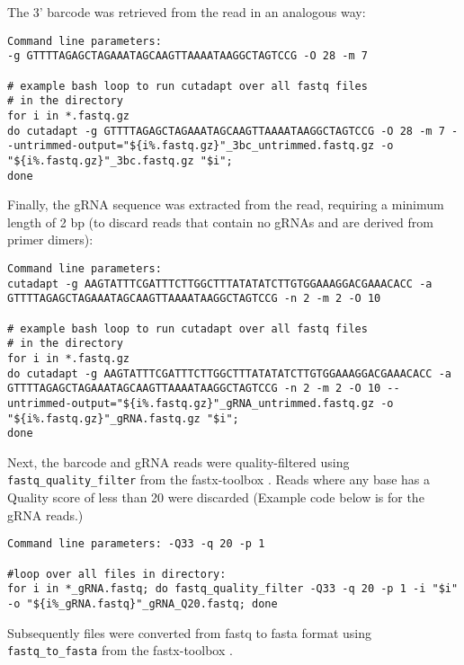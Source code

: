 The 3' barcode was retrieved from the read in an analogous way:

\begin{small}\begin{lstlisting}
Command line parameters:
-g GTTTTAGAGCTAGAAATAGCAAGTTAAAATAAGGCTAGTCCG -O 28 -m 7

# example bash loop to run cutadapt over all fastq files
# in the directory
for i in *.fastq.gz
do cutadapt -g GTTTTAGAGCTAGAAATAGCAAGTTAAAATAAGGCTAGTCCG -O 28 -m 7 --untrimmed-output="${i%.fastq.gz}"_3bc_untrimmed.fastq.gz -o "${i%.fastq.gz}"_3bc.fastq.gz "$i";
done
\end{lstlisting}\end{small}

Finally, the gRNA sequence was extracted from the read, requiring a minimum length of 2 bp (to discard reads that contain no gRNAs and are derived from primer dimers):

\begin{small}\begin{lstlisting}
Command line parameters:
cutadapt -g AAGTATTTCGATTTCTTGGCTTTATATATCTTGTGGAAAGGACGAAACACC -a GTTTTAGAGCTAGAAATAGCAAGTTAAAATAAGGCTAGTCCG -n 2 -m 2 -O 10

# example bash loop to run cutadapt over all fastq files 
# in the directory
for i in *.fastq.gz
do cutadapt -g AAGTATTTCGATTTCTTGGCTTTATATATCTTGTGGAAAGGACGAAACACC -a GTTTTAGAGCTAGAAATAGCAAGTTAAAATAAGGCTAGTCCG -n 2 -m 2 -O 10 --untrimmed-output="${i%.fastq.gz}"_gRNA_untrimmed.fastq.gz -o "${i%.fastq.gz}"_gRNA.fastq.gz "$i";
done

\end{lstlisting}\end{small}

Next, the barcode and gRNA reads were quality-filtered using \verb|fastq_quality_filter| from the fastx-toolbox \cite{Hannon:Online}. Reads where any base has a Quality score of less than 20 were discarded (Example code below is for the gRNA reads.) 

\begin{small}\begin{lstlisting}
Command line parameters: -Q33 -q 20 -p 1 

#loop over all files in directory:
for i in *_gRNA.fastq; do fastq_quality_filter -Q33 -q 20 -p 1 -i "$i" -o "${i%_gRNA.fastq}"_gRNA_Q20.fastq; done
\end{lstlisting}\end{small}

Subsequently files were converted from fastq to fasta format using \verb|fastq_to_fasta| from the fastx-toolbox \cite{Hannon:Online}. 

